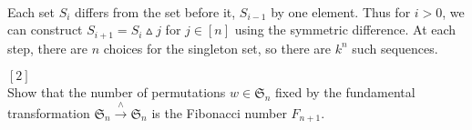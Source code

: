 \documentclass{article}
\newenvironment{problem}[2][Problem]{\begin{trivlist}
\item[\hskip \labelsep {\bfseries #1}\hskip \labelsep {\bfseries #2.}]}{\end{trivlist}}
\newenvironment{solution}[1][Solution.]{\begin{trivlist}
\item[\hskip \labelsep {\bfseries #1}]}{\end{trivlist}}
\begin{document}
\begin{solution} \text{} \\
  Each set $S_i$ differs from the set before it, $S_{i - 1}$ by one element.
  Thus for $i > 0$, we can construct $S_{i + 1} = S_i \vartriangle {j}$ for
  $j \in [n]$ using the symmetric difference.
  At each step, there are $n$ choices for the singleton set, so there are $k^n$ such
  sequences.
\end{solution}
\pagebreak
\begin{problem}{38} $[2]$ \\
  Show that the number of permutations $w \in \mathfrak S_n$ fixed by the
  fundamental transformation $\mathfrak S_n \xrightarrow{\wedge} \mathfrak S_n$
  is the Fibonacci number $F_{n + 1}$.
\end{problem}
\end{document}
